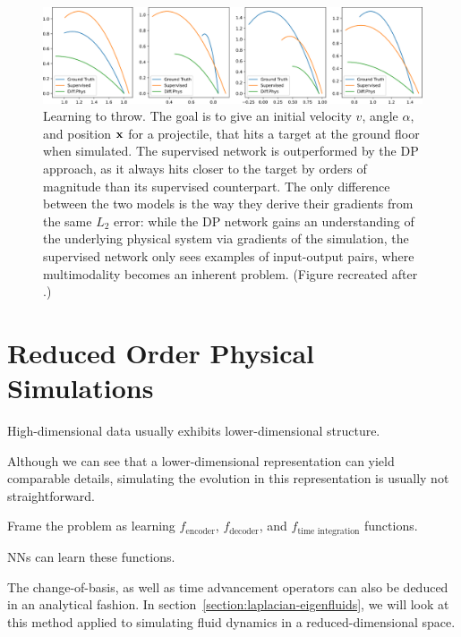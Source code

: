 \begin{figure}
  \centering
  \includegraphics[width=\textwidth]{figures/throwing_results}
  \caption{Learning to throw. The goal is to give an initial velocity $v$, angle
    $\alpha$, and position $\vb{x}$ for a projectile, that hits a target at the
    ground floor when simulated.  The supervised network is outperformed by the
    \ac{DP} approach, as it always hits closer to the target by orders of
    magnitude than its supervised counterpart.  The only difference between the
    two models is the way they derive their gradients from the same $L_2$
    error: while the \ac{DP} network gains an understanding of the underlying
    physical system via gradients of the simulation, the supervised network only
    sees examples of input-output pairs, where multimodality becomes an inherent
    problem.  (Figure recreated after \citet{LearnToThrow}.)
  }
    \label{fig:learning-to-throw}
\end{figure}

\section{Reduced Order Physical Simulations}
High-dimensional data usually exhibits lower-dimensional
structure.


Although we can see that a lower-dimensional representation can yield comparable
details, simulating the evolution in this representation is usually not
straightforward.

Frame the problem as learning $f_{\text{encoder}}$,
$f_{\text{decoder}}$, and $f_{\text{time integration}}$ functions.

NNs can learn these functions.

The change-of-basis, as well as time advancement operators can also be deduced
in an analytical fashion. In section~\ref{section:laplacian-eigenfluids}, we
will look at this method applied to simulating fluid dynamics in
a reduced-dimensional space.



